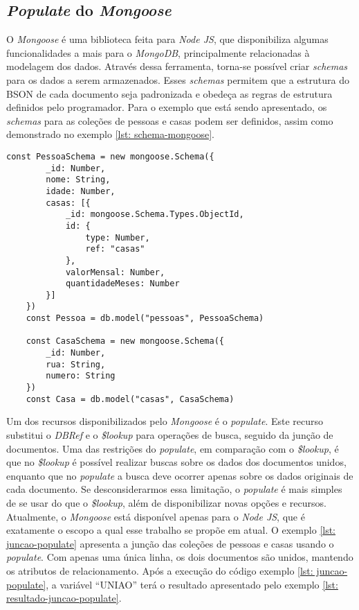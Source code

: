 \subsection{\textit{Populate} do \textit{Mongoose}}

O \textit{Mongoose} é uma biblioteca feita para \textit{Node JS}, que disponibiliza algumas funcionalidades a mais para o \textit{MongoDB}, principalmente relacionadas à modelagem dos dados. Através dessa ferramenta, torna-se possível criar \textit{schemas} para os dados a serem armazenados. Esses \textit{schemas} permitem que a estrutura do BSON de cada documento seja padronizada e obedeça as regras de estrutura definidos pelo programador. Para o exemplo que está sendo apresentado, os \textit{schemas} para as coleções de pessoas e casas podem ser definidos, assim como demonstrado no exemplo \ref{lst: schema-mongoose}.


\begin{lstlisting}[style=ES6, caption={Definição de \textit{Schemas} no \textit{Mongoose}\label{lst: schema-mongoose}}]
    const PessoaSchema = new mongoose.Schema({
        _id: Number,
        nome: String,
        idade: Number,
        casas: [{
            _id: mongoose.Schema.Types.ObjectId,
            id: {
                type: Number,
                ref: "casas"
            },
            valorMensal: Number,
            quantidadeMeses: Number
        }]
    })
    const Pessoa = db.model("pessoas", PessoaSchema)

    const CasaSchema = new mongoose.Schema({
        _id: Number,
        rua: String,
        numero: String
    })
    const Casa = db.model("casas", CasaSchema)
\end{lstlisting}

Um dos recursos disponibilizados pelo \textit{Mongoose} é o \textit{populate}. Este recurso substitui o \textit{DBRef} e o \textit{\$lookup} para operações de busca, seguido da junção de documentos. Uma das restrições do \textit{populate}, em comparação com o \textit{\$lookup}, é que no \textit{\$lookup} é possível realizar buscas sobre os dados dos documentos unidos, enquanto que no \textit{populate} a busca deve ocorrer apenas sobre os dados originais de cada documento. Se desconsiderarmos essa limitação, o \textit{populate} é mais simples de se usar do que o \textit{\$lookup}, além de disponibilizar novas opções e recursos. Atualmente, o \textit{Mongoose} está disponível apenas para o \textit{Node JS}, que é exatamente o escopo a qual esse trabalho se propõe em atual. O exemplo \ref{lst: juncao-populate} apresenta a junção das coleções de pessoas e casas usando o \textit{populate}. Com apenas uma única linha, os dois documentos são unidos, mantendo os atributos de relacionamento. Após a execução do código exemplo \ref{lst: juncao-populate}, a variável ``UNIAO'' terá o resultado apresentado pelo exemplo \ref{lst: resultado-juncao-populate}.

